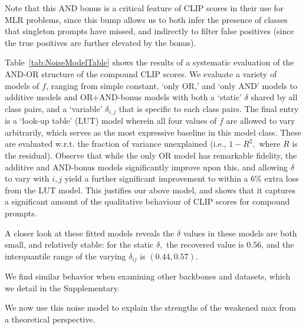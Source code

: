 Note that this AND bonus is a critical feature of CLIP scores in their use for MLR problems, since this bump allows us to both infer the presence of classes that singleton prompts have missed, and indirectly to filter false positives (since the true positives are further elevated by the bonus).



Table~\ref{tab:NoiseModelTable} shows the results of a systematic evaluation of the AND-OR structure of the compound CLIP scores. We evaluate a variety of models of $f$, ranging from simple constant, `only OR,' and `only AND' models to additive models and OR+AND-bonus models with both a `static' $\delta$ shared by all class pairs, and a `variable' $\delta_{i,j}$ that is specific to each class pairs. The final entry is a `look-up table' (LUT) model wherein all four values of $f$ are allowed to vary arbitrarily, which serves as the most expressive baseline in this model class. These are evaluated w.r.t. the fraction of variance unexplained (i.e., $1-R^2,$ where $R$ is the residual). Observe that while the only OR model has remarkable fidelity, the additive and AND-bonus models significantly improve upon this, and allowing $\delta$ to vary with $i,j$ yield a further significant improvement to within a $6\%$ extra loss from the LUT model. This justifies our above model, and shows that it captures a significant amount of the qualitative behaviour of CLIP scores for compound prompts. 

A closer look at these fitted models reveals the $\delta$ values in these models are both small, and relatively stable: for the static $\delta,$ the recovered value is $0.56$, and the interquantile range of the varying $\delta_{ij}$ is $(0.44, 0.57)$.  %

We find similar behavior when examining other backbones and datasets, which we detail in the Supplementary.

We now use this noise model to explain the strengths of the weakened max from a theoretical perspective.


